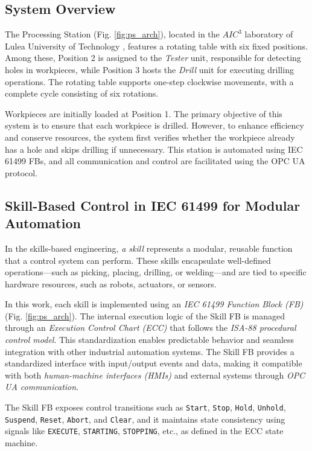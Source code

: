 \documentclass[conference]{IEEEtran}
\begin{document}
\subsection{System Overview}
The Processing Station (Fig. \ref{fig:ps_arch}), located in the $AIC^3$ laboratory of Lulea University of Technology \cite{aiccubelab}, features a rotating table with six fixed positions. Among these, Position 2 is assigned to the \textit{Tester} unit, responsible for detecting holes in workpieces, while Position 3 hosts the \textit{Drill} unit for executing drilling operations. The rotating table supports one-step clockwise movements, with a complete cycle consisting of six rotations.

Workpieces are initially loaded at Position 1. The primary objective of this system is to ensure that each workpiece is drilled. However, to enhance efficiency and conserve resources, the system first verifies whether the workpiece already has a hole and skips drilling if unnecessary. This  station is automated using IEC 61499 FBs, and all communication and control are facilitated using the OPC UA protocol.


\subsection{Skill-Based Control in IEC 61499 for Modular Automation}

In the skills-based engineering, \textit{a skill} represents a modular, reusable function that a control system can perform. These skills encapsulate well-defined operations—such as picking, placing, drilling, or welding—and are tied to specific hardware resources, such as robots, actuators, or sensors. 

In this work, each skill is implemented using an \textit{IEC 61499 Function Block (FB)} (Fig. \ref{fig:ps_arch}). The internal execution logic of the Skill FB is managed through an \textit{Execution Control Chart (ECC)} that follows the \textit{ISA-88 procedural control model}. This standardization enables predictable behavior and seamless integration with other industrial automation systems. The Skill FB provides a standardized interface with input/output events and data, making it compatible with both \textit{human-machine interfaces (HMIs)} and external systems through \textit{OPC UA communication}.

The Skill FB exposes control transitions such as \texttt{Start}, \texttt{Stop}, \texttt{Hold}, \texttt{Unhold}, \texttt{Suspend}, \texttt{Reset}, \texttt{Abort}, and \texttt{Clear}, and it maintains state consistency using signals like \texttt{EXECUTE}, \texttt{STARTING}, \texttt{STOPPING}, etc., as defined in the ECC state machine.
\end{document}
